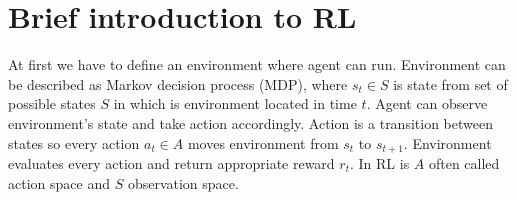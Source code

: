 
\section{Brief introduction to RL}
At first we have to define an environment where agent can run. Environment can be described as Markov decision process (MDP), where $s_t \in S$ is state from set of possible states $S$ in which is environment located in time $t$. Agent can observe environment's state and take action accordingly. Action is a transition between states so every action $a_t \in A$ moves environment from $s_t$ to $s_{t+1}$. Environment evaluates every action and return appropriate reward $r_t$. In RL is $A$ often called action space and $S$ observation space.  